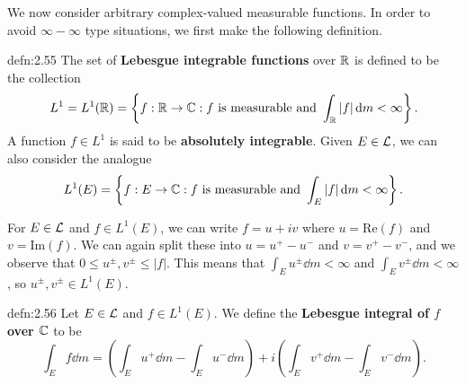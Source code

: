 We now consider arbitrary complex-valued measurable functions. 
In order to avoid $\infty - \infty$ type situations, we first make 
the following definition. 

\begin{defn}{defn:2.55}
    The set of {\bf Lebesgue integrable functions} over $\mathbb{R}$ is defined to be 
    the collection 
    \[ L^1 = L^1(\mathbb{R}) = \left\{ f : \mathbb{R} \to \mathbb{C} : f \text{ is measurable and } 
    \int_{\mathbb{R}} |f|\,\mathrm{d} m < \infty \right\}. \] 
    A function $f \in L^1$ is said to be {\bf absolutely integrable}. 
    Given $E \in {\cal L}$, we can also consider the analogue 
    \[ L^1(E) = \left\{ f : E \to \mathbb{C} : f \text{ is measurable and } 
    \int_E |f|\,\mathrm{d} m < \infty \right\}. \] 
\end{defn}

For $E \in {\cal L}$ and $f \in L^1(E)$, we can write $f = u+iv$ 
where $u = \text{Re}(f)$ and $v = \text{Im}(f)$. We can again 
split these into $u = u^+ - u^-$ and $v = v^+ - v^-$, and we observe that 
$0 \leq u^\pm, v^\pm \leq |f|$. This means that $\int_E u^\pm \dd m < \infty$ 
and $\int_E v^\pm \dd m < \infty$, so $u^\pm, v^\pm \in L^1(E)$. 

\begin{defn}{defn:2.56}
    Let $E \in {\cal L}$ and $f \in L^1(E)$. We define the {\bf Lebesgue 
    integral of $f$ over $\mathbb{C}$} to be 
    \[ \int_E f\dd m = \left( \int_E u^+\dd m - \int_E u^-\dd m 
    \right) + i\left( \int_E v^+\dd m - \int_E v^-\dd m \right). \] 
\end{defn}

